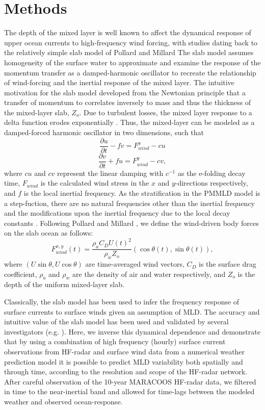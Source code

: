 \documentclass{article}
\begin{document}
\section*{Methods}
The depth of the mixed layer is well known to affect the dynamical response of upper ocean currents to high-frequency wind forcing, with studies dating back to the relatively simple slab model of Pollard and Millard \cite{Pollard1970a,Pollard1970} 
The slab model assumes homogeneity of the surface water to approximate and examine the response of the momentum transfer as a damped-harmonic oscillator to recreate the relationship of wind-forcing and the inertial response of the mixed layer. 
The intuitive motivation for the slab model developed from the Newtonian principle that a transfer of momentum to correlates inversely to mass and thus the thickness of the mixed-layer slab, $Z_o$. 
Due to turbulent losses, the mixed layer response to a delta function erodes exponentially \cite{Large1994}.
Thus, the mixed-layer can be modeled as a damped-forced harmonic oscillator in two dimensions, such that
\begin{equation}
    \frac{\partial u}{\partial t} - f v = F^{x}_{wind} - cu
\end{equation}
\begin{equation}
    \frac{\partial v}{\partial t} + f u = F^{y}_{wind} - cv,
\end{equation}
where $c{u}$ and $c{v}$ represent the linear damping with $c^{-1}$ as the e-folding decay time, $F_{wind}$ is the calculated wind stress in the $x$ and $y$-directions respectively, and $f$ is the local inertial frequency.
As the stratification in the PMMLD model is a step-fuction, there are no natural frequencies other than the inertial frequency and the modifications upon the inertial frequency due to the local decay constants \cite{Pollard1970a}. 
Following Pollard and Millard \cite{Pollard1970a}, we define the wind-driven body forces on the slab ocean as follows:
\begin{equation}
        F^{x,y}_{wind}(t) = \frac{\rho_a C_D U(t)^{2}}{\rho_w Z_o} (\cos\theta(t),\sin\theta(t)),  
\end{equation}
where $ \left ( U\sin\theta, U\cos\theta \right ) $ are time-averaged wind vectors, $C_D$ is the surface drag coefficient, $\rho_a$ and $\rho_w$ are the density of air and water respectively, and $Z_o$ is the depth of the uniform mixed-layer slab.


Classically, the slab model has been used to infer the frequency response of surface currents to surface winds given an assumption of MLD. 
The accuracy and intuitive value of the slab model has been used and validated by several investigators (e.g.  \cite{DAsaro1989,Jeronimo2010,Nam2013}).
Here, we inverse this dynamical dependence and demonstrate that by using a combination of high frequency (hourly) surface current observations from HF-radar and surface wind data from a numerical weather prediction model it is possible to predict MLD variability both spatially and through time, according to the resolution and scope of the HF-radar network. 
After careful observation of the 10-year MARACOOS HF-radar data, we filtered in time to the near-inertial band and allowed for time-lags between the modeled weather and observed ocean-response. 
\end{document}

